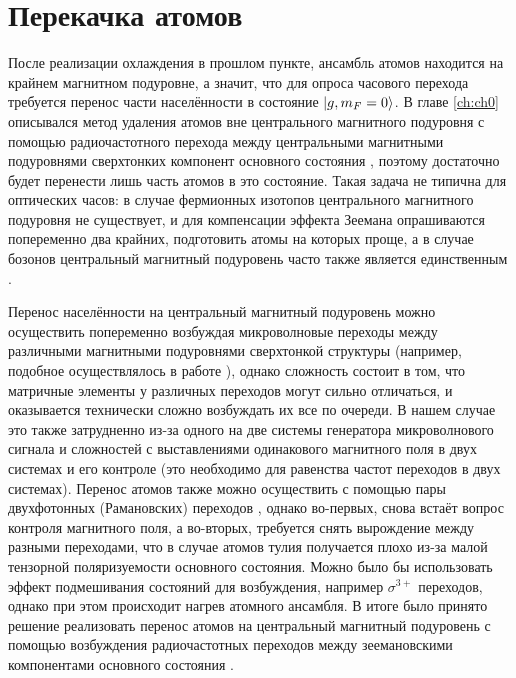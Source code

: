 \section{Перекачка атомов}

После реализации охлаждения в прошлом пункте, ансамбль атомов находится на крайнем магнитном подуровне, а значит, что для опроса часового перехода требуется перенос части населённости в состояние $\ket{g, m_F = 0}$.
В главе \ref{ch:ch0} описывался метод удаления атомов вне  центрального магнитного подуровня с помощью радиочастотного перехода между центральными магнитными подуровнями сверхтонких компонент основного состояния \cite{mishin2024combined}, поэтому достаточно будет перенести лишь часть атомов в это состояние. 
Такая задача не типична для оптических часов: в случае фермионных изотопов центрального магнитного подуровня не существует, и для компенсации эффекта Зеемана опрашиваются попеременно два крайних\cite{}, подготовить атомы на которых проще, а в случае бозонов центральный магнитный подуровень часто также является единственным \cite{}.

Перенос населённости на центральный магнитный подуровень можно осуществить попеременно возбуждая микроволновые переходы между различными магнитными подуровнями сверхтонкой структуры (например, подобное осуществлялось в работе \cite{}), однако сложность состоит в том, что матричные элементы у различных переходов могут сильно отличаться, и оказывается технически сложно возбуждать их все по очереди. 
В нашем случае это также затрудненно из-за одного на две системы генератора микроволнового сигнала и сложностей с выставлениями одинакового магнитного поля в двух системах и его контроле (это необходимо для равенства частот переходов в двух системах).
Перенос атомов также можно осуществить с помощью пары двухфотонных (Рамановских) переходов \cite{}, однако во-первых, снова встаёт вопрос контроля магнитного поля, а во-вторых, требуется снять вырождение между разными переходами, что в случае атомов тулия получается плохо из-за малой тензорной поляризуемости основного состояния. %
Можно было бы использовать эффект подмешивания состояний для возбуждения, например $\sigma^{3+}$ переходов, однако при этом происходит нагрев атомного ансамбля. %
В итоге было принято решение реализовать перенос атомов на центральный магнитный подуровень с помощью возбуждения радиочастотных переходов между зеемановскими компонентами основного состояния \cite{}.

